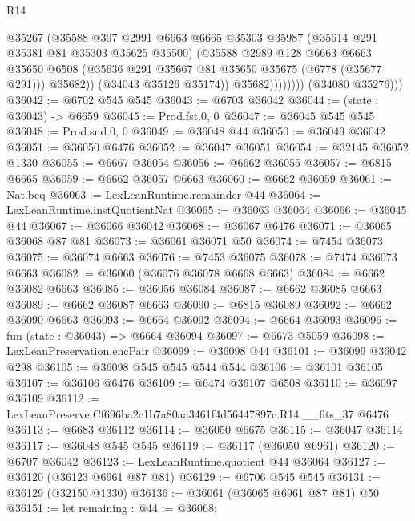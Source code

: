 \begin{lexlean}{R14}
\begin{coremodule}
                          @35267
                          (@35588
                            @397
                            @2991
                            @6663
                            @6665
                            @35303
                            @35987
                            (@35614 @291 @35381 @81 @35303 @35625 @35500)
                            (@35588
                              @2989
                              @128
                              @6663
                              @6663
                              @35650
                              @6508
                              (@35636 @291 @35667 @81 @35650 @35675 (@6778 (@35677 @291)))
                              @35682))
                          (@34043 @35126 @35174))
                        @35682))))))))
        (@34080 @35276)))
@36042 := @6702 @545 @545
@36043 := @6703 @36042
@36044 := (state : @36043) -> @6659
@36045 := Prod.fst.{0, 0}
@36047 := @36045 @545 @545
@36048 := Prod.snd.{0, 0}
@36049 := @36048 @44
@36050 := @36049 @36042
@36051 := @36050 @6476
@36052 := @36047 @36051
@36054 := @32145 @36052 @1330
@36055 := @6667 @36054
@36056 := @6662 @36055
@36057 := @6815 @6665
@36059 := @6662 @36057 @6663
@36060 := @6662 @36059
@36061 := Nat.beq
@36063 := LexLeanRuntime.remainder @44
@36064 := LexLeanRuntime.instQuotientNat
@36065 := @36063 @36064
@36066 := @36045 @44
@36067 := @36066 @36042
@36068 := @36067 @6476
@36071 := @36065 @36068 @87 @81
@36073 := @36061 @36071 @50
@36074 := @7454 @36073
@36075 := @36074 @6663
@36076 := @7453 @36075
@36078 := @7474 @36073 @6663
@36082 := @36060 (@36076 @36078 @6668 @6663)
@36084 := @6662 @36082 @6663
@36085 := @36056 @36084
@36087 := @6662 @36085 @6663
@36089 := @6662 @36087 @6663
@36090 := @6815 @36089
@36092 := @6662 @36090 @6663
@36093 := @6664 @36092
@36094 := @6664 @36093
@36096 := fun (state : @36043) => @6664 @36094
@36097 := @6673 @5059
@36098 := LexLeanPreservation.encPair
@36099 := @36098 @44
@36101 := @36099 @36042 @298
@36105 := @36098 @545 @545 @544 @544
@36106 := @36101 @36105
@36107 := @36106 @6476
@36109 := @6474 @36107 @6508
@36110 := @36097 @36109
@36112 := LexLeanPreserve.Cf696ba2c1b7a80aa3461f4d56447897c.R14.__fits_37 @6476
@36113 := @6683 @36112
@36114 := @36050 @6675
@36115 := @36047 @36114
@36117 := @36048 @545 @545
@36119 := @36117 (@36050 @6961)
@36120 := @6707 @36042
@36123 := LexLeanRuntime.quotient @44 @36064
@36127 := @36120 (@36123 @6961 @87 @81)
@36129 := @6706 @545 @545
@36131 := @36129 (@32150 @1330)
@36136 := @36061 (@36065 @6961 @87 @81) @50
@36151 := let remaining : @44 := @36068;

\end{coremodule}
\end{lexlean}
